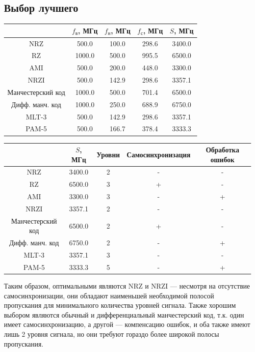\subsection{Выбор лучшего}
\begin{center}
    \begin{tabular}{c|cccc}
        & $f_\mathrm{\text{в}}$, МГц
        & $f_\mathrm{\text{н}}$, МГц
        & $f_\mathrm{\text{с}}$, МГц
        & $S$, МГц \\ \hline
        NRZ               &  500.0 & 100.0 & 298.6 & 3400.0 \\
        RZ                & 1000.0 & 500.0 & 995.5 & 6500.0 \\
        AMI               &  500.0 & 200.0 & 448.0 & 3300.0 \\
        NRZI              &  500.0 & 142.9 & 298.6 & 3357.1 \\
        Манчестерский код & 1000.0 & 500.0 & 701.4 & 6500.0 \\
        Дифф. манч. код   & 1000.0 & 250.0 & 688.9 & 6750.0 \\
        MLT-3             &  500.0 & 142.9 & 298.6 & 3357.1 \\
        PAM-5             &  500.0 & 166.7 & 378.4 & 3333.3 \\
    \end{tabular}
\end{center}

\begin{center}
    \begin{tabular}{c|cccc}
        & $S$, МГц
        & Уровни
        & Самосинхронизация
        & Обработка ошибок \\ \hline
        NRZ               & 3400.0 & 2 & - & - \\
        RZ                & 6500.0 & 3 & + & - \\
        AMI               & 3300.0 & 3 & - & + \\
        NRZI              & 3357.1 & 2 & - & - \\
        Манчестерский код & 6500.0 & 2 & + & - \\
        Дифф. манч. код   & 6750.0 & 2 & - & + \\
        MLT-3             & 3357.1 & 3 & - & - \\
        PAM-5             & 3333.3 & 5 & - & + \\
    \end{tabular}
\end{center}

Таким образом, оптимальными являются NRZ и NRZI --- несмотря на отсутствие самосинхронизации,
они обладают наименьшей необходимой полосой пропускания для минимального количества уровней сигнала.
Также хорошим выбором являются обычный и дифференциальный манчестерский код, т.к.
один имеет самосинхронизацию, а другой --- компенсацию ошибок, и оба также имеют лишь 2 уровня сигнала,
но они требуют гораздо более широкой полосы пропускания.
